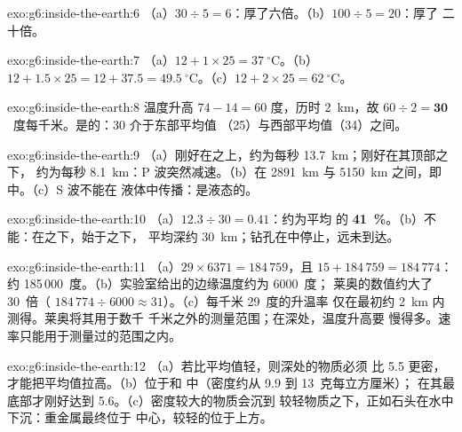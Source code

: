 \begin{solution}{exo:g6:inside-the-earth:6}
（a）$30 \div 5 = 6$：厚了六倍。（b）$100 \div 5 = 20$：厚了
二十倍。
\end{solution}

\begin{solution}{exo:g6:inside-the-earth:7}
（a）$12 + 1 \times 25 = 37~^\circ$C。（b）$12 + 1.5 \times 25 = 12 + 37.5 =
49.5~^\circ$C。（c）$12 + 2 \times 25 = 62~^\circ$C。
\end{solution}

\begin{solution}{exo:g6:inside-the-earth:8}
温度升高 $74 - 14 = 60$ 度，历时 2~km，故 $60 \div 2 =
\textbf{30}$~度每千米。是的：30 介于东部平均值
（25）与西部平均值（34）之间。
\end{solution}

\begin{solution}{exo:g6:inside-the-earth:9}
（a）刚好在之上，约为每秒 13.7~km；刚好在其顶部之下，
约为每秒 8.1~km：P 波突然减速。（b）在
2891~km 与 5150~km 之间，即中。（c）S 波不能在
液体中传播：是液态的。
\end{solution}

\begin{solution}{exo:g6:inside-the-earth:10}
（a）$12.3 \div 30 = 0.41$：约为平均
的 \textbf{41~\%}。（b）不能：在之下，始于之下，
平均深约 30~km；钻孔在中停止，远未到达。
\end{solution}

\begin{solution}{exo:g6:inside-the-earth:11}
（a）$29 \times 6371 = 184\,759$，且 $15 + 184\,759 = 184\,774$：约
185\,000~度。（b）实验室给出的边缘温度约为 6000~度；
莱奥的数值约大了 30~倍（
$184\,774 \div 6000 \approx 31$）。（c）每千米 29~度的升温率
仅在最初约 2~km 内测得。莱奥将其用于数千
千米之外的测量范围；在深处，温度升高要
慢得多。速率只能用于测量过的范围之内。
\end{solution}

\begin{solution}{exo:g6:inside-the-earth:12}
（a）若比平均值轻，则深处的物质必须
比 5.5 更密，才能把平均值拉高。（b）位于和
中（密度约从 9.9 到 13~克每立方厘米）；
在其最底部才刚好达到 5.6。（c）密度较大的物质会沉到
较轻物质之下，正如石头在水中下沉：重金属最终位于
中心，较轻的位于上方。
\end{solution}


